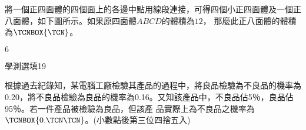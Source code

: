 \begin{QUESTIONS}
\begin{QUESTION}
\begin{QBODY}
		將一個正四面體的四個面上的各邊中點用線段連接，可得四個小正四面體及一個正八面體，如下圖所示。如果原四面體$ABCD$的體積為$12$，
那麼此正八面體的體積為$\TCNBOX{\TCN}$。
        \end{QBODY}
        \begin{QFROMS}
        \end{QFROMS}
        \begin{QTAGS}\end{QTAGS}
        \begin{QANS}
            $6$
        \end{QANS}
        \begin{QSOLLIST}
        \end{QSOLLIST}
        \begin{QEMPTYSPACE}
        \end{QEMPTYSPACE}
    \end{QUESTION}
    \begin{QUESTION}
        \begin{ExamInfo}{90}{學測}{選填}{19}
        \end{ExamInfo}
        \begin{ExamAnsRateInfo}{}{}{}{}
        \end{ExamAnsRateInfo}
        \begin{QBODY}
			根據過去紀錄知，某電腦工廠檢驗其產品的過程中，將良品檢驗為不良品的機率為0.20，將不良品檢驗為良品的機率為0.16。又知該產品中，不良品佔5％，良品佔95％。若一件產品被檢驗為良品，但該產
品實際上為不良品之機率為 $\TCNBOX {0.\TCN\TCN     }$。(小數點後第三位四捨五入)


\end{QBODY}
\end{QUESTION}
\end{QUESTIONS}
